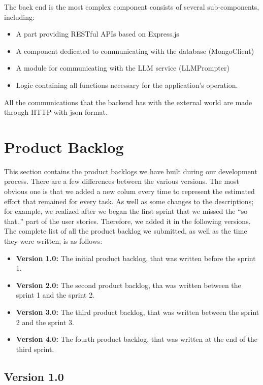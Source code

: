 \documentclass{article}
\begin{document}
The back end is the most complex component consists of several sub-components, including:
\begin{itemize}
  \item A part providing RESTful APIs based on Express.js
  \item A component dedicated to communicating with the database (MongoClient)
  \item A module for communicating with the LLM service (LLMPrompter)
  \item Logic containing all functions necessary for the application's operation.
\end{itemize}
All the communications that the backend has with the external world are made through HTTP with json format.
\newpage
\section{Product Backlog}

This section contains the product backlogs we have built during our development process.
There are a few differences between the various versions. The most obvious one is that we added a new colum
every time to represent the estimated effort that remained for every task. As well as some changes to the descriptions;
for example, we realized after we began the first sprint that we missed the ``so that..'' part of the user stories.
Therefore, we added it in the following versions.\newline
The complete list of all the product backlog we submitted, as well as the time they were written, is as follows:

\begin{itemize}
  \item \textbf{Version 1.0:} The initial product backlog, that was written before the sprint 1.
  \item \textbf{Version 2.0:} The second product backlog, tha was written between the sprint 1 and the sprint 2.
  \item \textbf{Version 3.0:} The third product backlog, that was written between the sprint 2 and the sprint 3.
  \item \textbf{Version 4.0:} The fourth product backlog, that was written at the end of the third sprint.
\end{itemize}
\subsection{Version 1.0}

\end{document}
